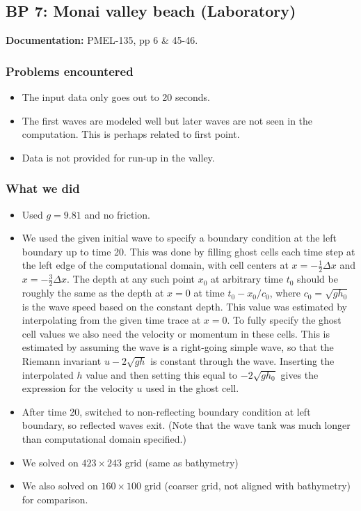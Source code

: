 
\subsection{BP 7:
 Monai valley beach (Laboratory)}

{\bf Documentation:}  PMEL-135, pp 6 \& 45-46.

\subsubsection{Problems encountered}

\begin{itemize}
\item The input data only goes out to 20 seconds.

\item The first waves are modeled well but later waves are not seen in the
computation.  This is perhaps related to first point.  

\item Data is not provided for run-up in the valley.
\end{itemize}

\subsubsection{What we did}

\begin{itemize}
\item Used $g=9.81$ and no friction.
\item We used the given initial wave to specify a boundary condition at the left
boundary up to time 20.  This was done by filling ghost cells each time step
at the left edge of the computational domain, with cell centers at $x = -
\frac 1 2 \Delta x$ and $x = -\frac 3 2 \Delta x$.
The depth at any such point $x_0$ at arbitrary time $t_0$ should be roughly
the same as the depth at $x=0$ at time $t_0 - x_0/c_0$, where $c_0 =
\sqrt{gh_0}$ is the wave speed based on the constant depth.  This value was
estimated by 
interpolating from the given time trace at $x=0$.
To fully specify the ghost cell values we also need the velocity or momentum
in these cells.  This is estimated by assuming the wave is a right-going
simple wave, so that the Riemann invariant $u - 2\sqrt{gh}$ is constant
through the wave.  Inserting the interpolated $h$ value and then setting this
equal to $-2\sqrt{gh_0}$ gives the expression for the velocity $u$ used in
the ghost cell.

\item After time 20, switched to non-reflecting boundary condition 
at left boundary, so reflected waves exit.  
(Note that the wave tank was much longer than computational domain specified.)
\item We solved on $423\times 243$ grid (same as bathymetry)
\item We also solved on $160\times 100$ grid (coarser grid, 
not aligned with bathymetry) for comparison.
\end{itemize} 

